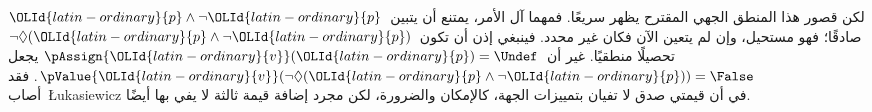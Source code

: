 \documentclass[../../../include/open-logic-section]{subfiles}
\begin{document}
لكن قصور هذا المنطق الجهي المقترح يظهر سريعًا. فمهما آل الأمر، يمتنع
أن يتبين~${\OLId{latin-ordinary}{p}} \land \lnot {\OLId{latin-ordinary}{p}}$ صادقًا؛ فهو مستحيل، وإن لم يتعين الآن
فكان غير محدد. فينبغي إذن أن تكون~$\lnot \Diamond({\OLId{latin-ordinary}{p}} \land \lnot {\OLId{latin-ordinary}{p}})$
تحصيلًا منطقيًا. غير أن~$\pAssign {\OLId{latin-ordinary}{v}}({\OLId{latin-ordinary}{p}}) = \Undef$ يجعل
$\pValue {\OLId{latin-ordinary}{v}}(\lnot \Diamond({\OLId{latin-ordinary}{p}} \land \lnot {\OLId{latin-ordinary}{p}})) = \False$.
فقد أصاب~\L ukasiewicz في أن قيمتي صدق لا تفيان بتمييزات الجهة،
كالإمكان والضرورة، لكن مجرد إضافة قيمة ثالثة لا يفي بها أيضًا.
\end{document}

